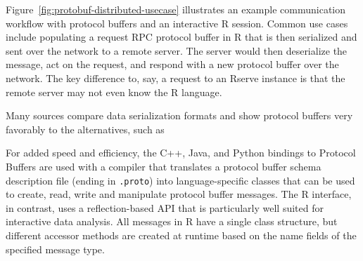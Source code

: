 \documentclass[article]{jss}
\begin{document}
Figure~\ref{fig:protobuf-distributed-usecase} illustrates an example
communication workflow with protocol buffers and an interactive R
session.  Common use cases include populating a request RPC protocol
buffer in R that is then serialized and sent over the network to a
remote server.  The server would then deserialize the message, act on
the request, and respond with a new protocol buffer over the network. The key
difference to, say, a request to an Rserve instance is that the remote server
may not even know the R language.




Many sources compare data serialization formats and show protocol
buffers very favorably to the alternatives, such
as \citet{Sumaray:2012:CDS:2184751.2184810}



For added speed and efficiency, the C++, Java, and Python bindings to
Protocol Buffers are used with a compiler that translates a protocol
buffer schema description file (ending in \texttt{.proto}) into
language-specific classes that can be used to create, read, write and
manipulate protocol buffer messages.  The R interface, in contrast,
uses a reflection-based API that is particularly well suited for
interactive data analysis.  All messages in R have a single class
structure, but different accessor methods are created at runtime based
on the name fields of the specified message type.
\end{document}
